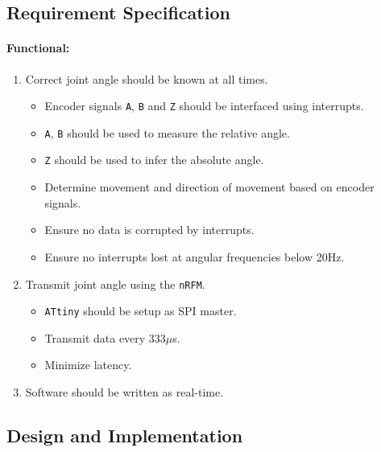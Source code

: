 \subsection{Requirement Specification} 

\paragraph{Functional:}
\begin{enumerate}[resume]
	\item Correct joint angle should be known at all times.
	\label{enum:joint_correct_angles}
	\begin{itemize}
		\item Encoder signals \texttt{A}, \texttt{B} and \texttt{Z} should be interfaced using interrupts.
		\item \texttt{A}, \texttt{B} should be used to measure the relative angle.
		\item \texttt{Z} should be used to infer the absolute angle. 
		\item Determine movement and direction of movement based on encoder signals.
		\item Ensure no data is corrupted by interrupts.
		\item Ensure no interrupts lost at angular frequencies below 20Hz.
	\end{itemize}
	\item Transmit joint angle using the \texttt{nRFM}.
	\label{enum:joint_transmit}
	\begin{itemize}
		\item \texttt{ATtiny} should be setup as SPI master.
		\item Transmit data every 333$\mu$s.
		\item Minimize latency.
	\end{itemize}
	\item Software should be written as real-time.
	\label{enum:joint_real_time}
\end{enumerate}

\subsection{Design and Implementation} %
\label{sub:design_and_implementation}


